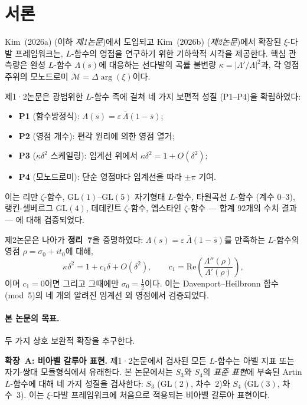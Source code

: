 \documentclass[11pt, a4paper]{article}
\theoremstyle{plain}
\theoremstyle{definition}
\newcommand{\abs}[1]{\left|#1\right|}
\newcommand{\Lam}{\Lambda}             %
\newcommand{\kap}{\kappa}             %
\newcommand{\mono}{\mathcal{M}}       %
\begin{document}
\tableofcontents
\newpage


\section{서론}
\label{sec:intro}

Kim~(2026a) (이하 \textit{제1논문})에서 도입되고 Kim~(2026b)
(\textit{제2논문})에서 확장된 $\xi$-다발 프레임워크는,
$L$-함수의 영점을 연구하기 위한 기하학적 시각을 제공한다.
핵심 관측량은 완성 $L$-함수 $\Lam(s)$에 대응하는 선다발의
곡률 불변량 $\kap = \abs{\Lam'/\Lam}^{2}$과,
각 영점 주위의 모노드로미 $\mono = \Delta\arg(\xi)$이다.

제1·2논문은 광범위한 $L$-함수 족에 걸쳐 네 가지 보편적 성질 (P1--P4)을 확립하였다:
\begin{itemize}
  \item \textbf{P1} (함수방정식): $\Lam(s) = \varepsilon\,\overline{\Lam}(1-\bar{s})$;
  \item \textbf{P2} (영점 개수): 편각 원리에 의한 영점 열거;
  \item \textbf{P3} ($\kap\delta^{2}$ 스케일링): 임계선 위에서 $\kap\delta^{2} = 1 + O(\delta^{2})$;
  \item \textbf{P4} (모노드로미): 단순 영점마다 임계선을 따라 $\pm\pi$ 기여.
\end{itemize}
이는 리만 $\zeta$-함수, $\mathrm{GL}(1)$--$\mathrm{GL}(5)$ 자기형태 $L$-함수,
타원곡선 $L$-함수 (계수 0--3), 랭킨-셀베르그 $\mathrm{GL}(4)$,
데데킨트 $\zeta$-함수, 엡스타인 $\zeta$-함수 --- 합계 92개의 수치 결과 ---
에 대해 검증되었다.

제2논문은 나아가 \textbf{정리~7}을 증명하였다:
$\Lam(s)=\varepsilon\,\overline{\Lam}(1-\bar{s})$를 만족하는
$L$-함수의 영점 $\rho = \sigma_{0}+it_{0}$에 대해,
\[
  \kap\delta^{2} = 1 + c_{1}\delta + O(\delta^{2}),
  \qquad c_{1} = \mathrm{Re}\!\left(\frac{\Lam''(\rho)}{\Lam'(\rho)}\right),
\]
이며 $c_{1}=0$이면 그리고 그때에만 $\sigma_{0}=\tfrac{1}{2}$이다.
이는 Davenport--Heilbronn 함수 (mod~5)의 네 개의 알려진 임계선 외 영점에서 검증되었다.

\paragraph{본 논문의 목표.}
두 가지 상호 보완적 확장을 추구한다.

\textbf{확장~A: 비아벨 갈루아 표현.}
제1·2논문에서 검사된 모든 $L$-함수는 아벨 지표 또는 자기-쌍대 모듈형식에서 유래한다.
본 논문에서는 $S_{3}$와 $S_{4}$의 \emph{표준 표현}에 부속된 Artin $L$-함수에 대해
네 가지 성질을 검사한다:
$S_{3}$ ($\mathrm{GL}(2)$, 차수~2)와 $S_{4}$ ($\mathrm{GL}(3)$, 차수~3).
이는 $\xi$-다발 프레임워크에 처음으로 적용되는 비아벨 갈루아 표현이다.
\end{document}
